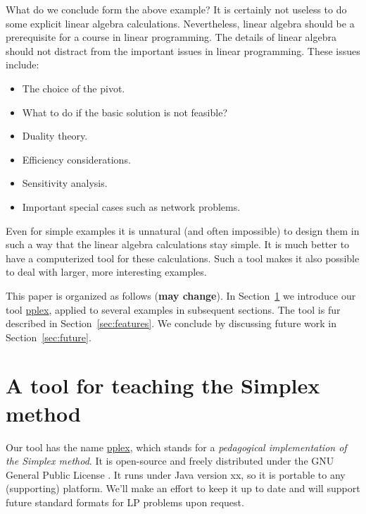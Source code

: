 \documentclass[ukenglish]{nik}
\begin{document}
What do we conclude form the above example? It is certainly not useless to do some explicit
linear algebra calculations. Nevertheless, linear algebra should be a prerequisite for a course
in linear programming. The details of linear algebra should not distract from the important
issues in linear programming. These issues include:
\begin{itemize}
\item The choice of the pivot.
\item What to do if the basic solution is not feasible?
\item Duality theory.
\item Efficiency considerations.
\item Sensitivity analysis.
\item Important special cases such as network problems.
\end{itemize}
Even for simple examples it is unnatural (and often impossible)
to design them in such a way that the linear algebra calculations stay simple.
It is much better to have a computerized tool for these calculations. Such a tool makes
it also possible to deal with larger, more interesting examples. 

This paper is organized as follows ({\bf may change}). 
In Section~\ref{sec:pplex} we introduce 
our tool \url{pplex}, applied to several examples in subsequent sections.
The tool is fur described in Section~\ref{sec:features}.
We conclude by discussing future work in Section~\ref{sec:future}.


\section{A tool for teaching the Simplex method}\label{sec:pplex}
Our tool has the name \url{pplex},
which stands for a \emph{pedagogical implementation of the Simplex method}.
It is open-source \cite{pplex} and freely distributed under the 
GNU General Public License \cite{GNUGPL}.
It runs under Java version xx, so it is portable to any (supporting) platform.
We'll make an effort to keep it up to date and will support future standard
formats for LP problems upon request.
\end{document}
